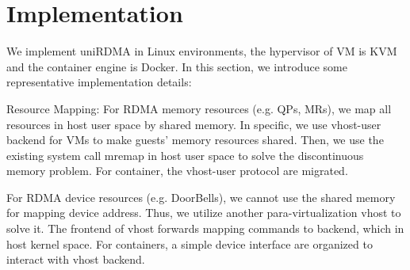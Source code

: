 \section{Implementation}
 We implement uniRDMA in Linux environments, the hypervisor of VM is KVM and the container engine is Docker. In this section, we introduce some representative implementation details:
 
 Resource Mapping: For RDMA memory resources (e.g. QPs, MRs), we map all resources in host user space by shared memory. In specific, we use vhost-user backend for VMs to make guests' memory resources shared. Then, we use the existing system call mremap in host user space to solve the discontinuous memory problem. For container, the vhost-user protocol are migrated. 
 
 For RDMA device resources (e.g. DoorBells), we cannot use the shared memory for mapping device address. Thus, we utilize another para-virtualization vhost to solve it. The frontend of vhost forwards mapping commands to backend, which in host kernel space. For containers, a simple device interface are organized to interact with vhost backend.
 